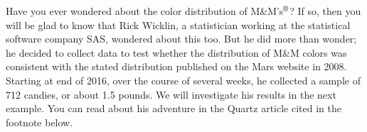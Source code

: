 Have you ever wondered about the color distribution of M\&M's$^{\text{\textregistered}}$?  If so, then you will be glad to know that Rick Wicklin, a statistician working at the statistical software company SAS, wondered about this too.  But he did more than wonder; he decided to collect data to test whether the distribution of M\&M colors was consistent with the stated distribution published on the Mars website in 2008.  Starting at end of 2016, over the course of several weeks, he collected a sample of 712 candies, or about 1.5 pounds.  We will investigate his results in the next example.  You can read about his adventure in the Quartz article cited in the footnote below.\footnotemark 
{}

